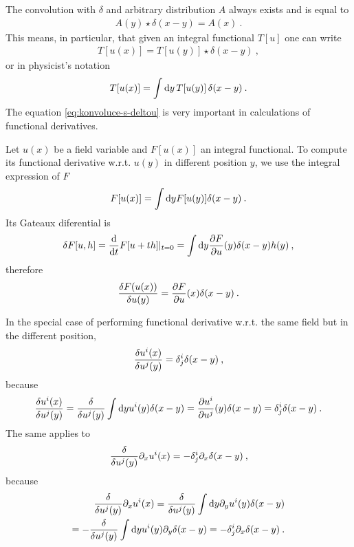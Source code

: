 The convolution with $\delta$ and arbitrary distribution $A$ always exists and is equal to
\begin{align}
    A(y) \star \delta(x-y) = A(x) \:.
\end{align}
This means, in particular, that given an integral functional $T[u]$ one can write
\begin{align}
    T[u(x)] = T[u(y)]  \star \delta(x-y)  \:,
\end{align}
or in physicist's notation
\begin{align}
    T[u(x)] = \int \mathrm{d} y \, T[u(y)] \, \delta(x-y) \:. \label{eq:konvoluce-s-deltou}
\end{align}
The equation \eqref{eq:konvoluce-s-deltou} is very important in calculations of functional derivatives.
\begin{example}
    Let $u(x)$ be a field variable and $F[u(x)]$ an integral functional. 
    To compute its functional derivative w.r.t. $u(y)$ in different position $y$, we use the integral expression of $F$
    \begin{align}
        F[u(x)] = \int \mathrm{d} y F[u(y)] \delta (x-y) \:.
    \end{align}
    Its Gateaux diferential is
    \begin{align}
        \delta F[u,h] = \frac{\mathrm{d}}{\mathrm{d}t} F[u+th]|_{t=0} = \int \mathrm{d} y \frac{\partial F}{\partial u}(y) \delta(x-y) h(y) \:,
    \end{align}
    therefore
    \begin{align}
        \frac{\delta F(u(x))}{\delta u(y)} = \frac{\partial F}{\partial u}(x) \delta(x-y) \:.
    \end{align}
\end{example}

\begin{example}
    In the special case of performing functional derivative w.r.t. the same field but in the different position,
    \begin{align}
        \frac{\delta u^i(x)}{\delta u^j(y)} = \delta^i_j \delta(x-y) \:,
    \end{align}
    because
    \begin{align}
        \frac{\delta u^i(x)}{\delta u^j(y)} = \frac{\delta }{\delta u^j(y)} \int \mathrm{d} y u^i(y) \delta (x-y) = \frac{\partial u^i}{\partial u^j}(y) \delta (x-y) = \delta^i_j \delta (x-y) \:.
    \end{align}
    The same applies to
    \begin{align}
        \frac{\delta }{\delta u^j(y)} \partial_x u^i(x) = - \delta^i_j \partial_x \delta(x-y) \:,
    \end{align}
    because
    \begin{align}
        \frac{\delta }{\delta u^j(y)} \partial_x u^i(x) = \frac{\delta }{\delta u^j(y)} \int \mathrm{d} y \partial_y u^i(y) \delta(x-y) 
        \\ = -\frac{\delta }{\delta u^j(y)} \int \mathrm{d} y u^i(y) \partial_y \delta(x-y) = - \delta^i_j \partial_x \delta(x-y) \:.
    \end{align}
\end{example}